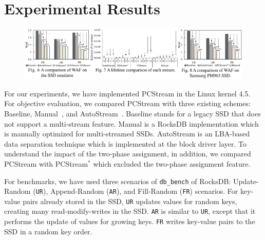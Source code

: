 \vspace{-10pt}
\section{Experimental Results}
\vspace{-5pt}

\begin{figure}[t]
	\centering
	\includegraphics[width=1\textwidth]{figure/expfig}
	\label{fig:exp}
	\vspace{-35pt}
\end{figure}

For our experiments, we have implemented \textsf{PCStream} in the Linux kernel
4.5.  For objective evaluation, we compared \textsf{PCStream} with three
existing schemes: \textsf{Baseline}, \textsf{Manual}~\cite{MultiStream}, and
\textsf{AutoStream}~\cite{AutoStream}.  \textsf{Baseline} stands for a legacy
SSD that does not support a multi-stream feature. \textsf{Manual} is a RocksDB
implementation which is manually optimized for multi-streamed SSDs.
\textsf{AutoStream} is an LBA-based data separation technique which is
implemented at the block driver layer. To understand the impact of the
two-phase assignment, in addition, we compared \textsf{PCStream} with
\textsf{PCStream$^{*}$} which excluded the two-phase assignment feature.

For benchmarks, we have used three scenarios of \texttt{db\_bench} of RocksDB:
Update-Random (\texttt{UR}), Append-Random (\texttt{AR}), and Fill-Random
(\texttt{FR}) scenarios.  For key-value pairs already stored in the SSD,
\texttt{UR} updates values for random keys, creating many
read-modify-writes in the SSD.  \texttt{AR} is similar to \texttt{UR}, except
that it performs the update of values for growing keys. \texttt{FR} writes
key-value pairs to the SSD in a random key order.

